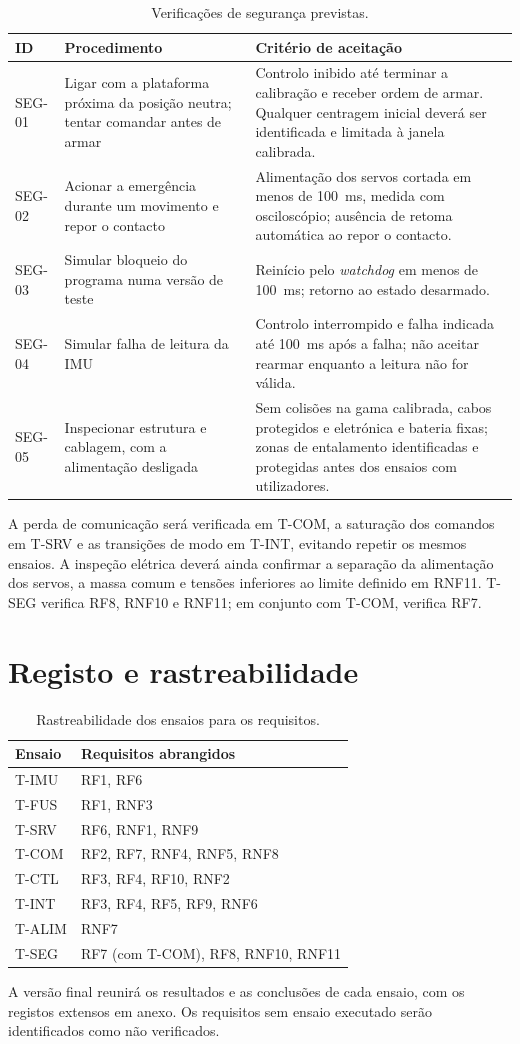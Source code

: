 \begin{table}[H]
\centering\small
\caption{Verificações de segurança previstas.}
\begin{tabularx}{\textwidth}{p{1.6cm}YY}
\toprule
ID & Procedimento & Critério de aceitação\\\midrule
SEG-01 & Ligar com a plataforma próxima da posição neutra; tentar comandar antes de armar & Controlo inibido até terminar a calibração e receber ordem de armar. Qualquer centragem inicial deverá ser identificada e limitada à janela calibrada.\\
SEG-02 & Acionar a emergência durante um movimento e repor o contacto & Alimentação dos servos cortada em menos de \SI{100}{\milli\second}, medida com osciloscópio; ausência de retoma automática ao repor o contacto.\\
SEG-03 & Simular bloqueio do programa numa versão de teste & Reinício pelo \textit{watchdog} em menos de \SI{100}{\milli\second}; retorno ao estado desarmado.\\
SEG-04 & Simular falha de leitura da IMU & Controlo interrompido e falha indicada até \SI{100}{\milli\second} após a falha; não aceitar rearmar enquanto a leitura não for válida.\\
SEG-05 & Inspecionar estrutura e cablagem, com a alimentação desligada & Sem colisões na gama calibrada, cabos protegidos e eletrónica e bateria fixas; zonas de entalamento identificadas e protegidas antes dos ensaios com utilizadores.\\
\bottomrule
\end{tabularx}
\label{tab:t-seg}
\end{table}

A perda de comunicação será verificada em T-COM, a saturação dos comandos em T-SRV e as transições de modo em T-INT, evitando repetir os mesmos ensaios. A inspeção elétrica deverá ainda confirmar a separação da alimentação dos servos, a massa comum e tensões inferiores ao limite definido em RNF11. T-SEG verifica RF8, RNF10 e RNF11; em conjunto com T-COM, verifica RF7.

\section{Registo e rastreabilidade}
\begin{table}[H]
\centering\small
\caption{Rastreabilidade dos ensaios para os requisitos.}
\begin{tabularx}{\textwidth}{p{2.2cm}Y}
\toprule
Ensaio & Requisitos abrangidos\\\midrule
T-IMU & RF1, RF6\\
T-FUS & RF1, RNF3\\
T-SRV & RF6, RNF1, RNF9\\
T-COM & RF2, RF7, RNF4, RNF5, RNF8\\
T-CTL & RF3, RF4, RF10, RNF2\\
T-INT & RF3, RF4, RF5, RF9, RNF6\\
T-ALIM & RNF7\\
T-SEG & RF7 (com T-COM), RF8, RNF10, RNF11\\
\bottomrule
\end{tabularx}
\label{tab:rastreabilidade}
\end{table}

A versão final reunirá os resultados e as conclusões de cada ensaio, com os registos extensos em anexo. Os requisitos sem ensaio executado serão identificados como não verificados.
